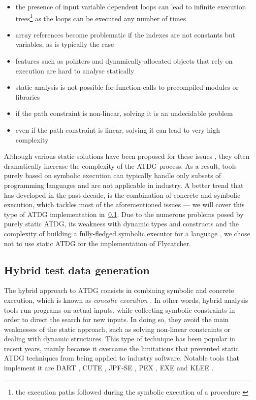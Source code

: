 \documentclass[a4paper,11pt,titlepage]{report}
\begin{document}
\begin{itemize}
	\item the presence of input variable dependent loops can lead to infinite execution trees\footnote{the execution paths followed during the symbolic execution of a procedure \cite{king1976symbolic}} as the loops can be executed any number of times
	\item array references become problematic if the indexes are not constants but variables, as is typically the case
	\item features such as pointers and dynamically-allocated objects that rely on execution are hard to analyse statically
	\item static analysis is not possible for function calls to precompiled modules or libraries
	\item if the path constraint is non-linear, solving it is an undecidable problem
	\item even if the path constraint is linear, solving it can lead to very high complexity
\end{itemize}

Although various static solutions have been proposed for these issues \cite{ramamoorthy1976automated,goldberg1994applications,offutt1999dynamic}, they often dramatically increase the complexity of the ATDG process. As a result, tools purely based on symbolic execution can typically handle only subsets of programming languages and are not applicable in industry. A better trend that has developed in the past decade, is the combination of concrete and symbolic execution, which tackles most of the aforementioned issues \cite{păsăreanu2009survey} --- we will cover this type of ATDG implementation in~\ref{subsec:hybrid_atdg}. Due to the numerous problems posed by purely static ATDG, its weakness with dynamic types and constructs \cite{edvardsson1999survey,tahbildar2automated} and the complexity of building a fully-fledged symbolic executor for a language \cite{edvardsson1999survey,han2008empirical}, we chose not to use static ATDG for the implementation of \textsf{Flycatcher}.

\subsection{Hybrid test data generation}
\label{subsec:hybrid_atdg}

The hybrid approach to ATDG consists in combining symbolic and concrete execution, which is known as \emph{concolic execution} \cite{păsăreanu2009survey}. In other words, hybrid analysis tools run programs on actual inputs, while collecting symbolic constraints in order to direct the search for new inputs. In doing so, they avoid the main weaknesses of the static approach, such as solving non-linear constraints or dealing with dynamic structures. This type of technique has been popular in recent years, mainly because it overcame the limitations that prevented static ATDG techniques from being applied to industry software. Notable tools that implement it are DART \cite{godefroid2005dart}, CUTE \cite{sen2005cute}, JPF-SE \cite{anand2007jpf}, PEX \cite{tillmann2008pex}, EXE \cite{cadar2008exe} and KLEE \cite{cadar2008klee}.
\end{document}
